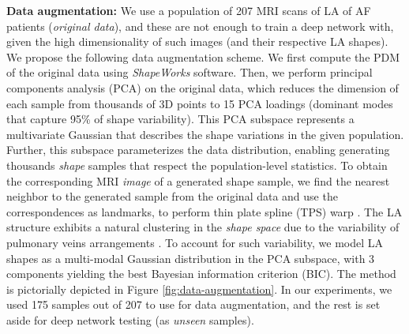 \documentclass[twocolumn]{cinc}
\begin{document}
\vspace{0.05in}
\noindent\textbf{Data augmentation: }
We use a population of 207 MRI scans of LA of AF patients (\textit{original data}), and these are not enough to train a deep network with, given the high dimensionality of such images (and their respective LA shapes).
%
We propose the following data augmentation scheme. We first compute the PDM of the original data using \emph{ShapeWorks} \cite{cates2017shapeworks} software. Then, we perform principal components analysis (PCA) on the original data, which reduces the dimension of each sample from thousands of 3D points to 15 PCA loadings (dominant modes that capture 95\% of shape variability). This PCA subspace represents a multivariate Gaussian that describes the shape variations in the given population. Further, this subspace parameterizes the data distribution, enabling generating thousands \textit{shape} samples that respect the population-level statistics. To obtain the corresponding MRI \textit{image} of a generated shape sample, we find the nearest neighbor to the generated sample from the original data and use the correspondences as landmarks, to perform thin plate spline (TPS) warp \cite{bookstein1989principal}. 
%
%
The LA structure exhibits a natural clustering in the \emph{shape space} due to the variability of pulmonary veins arrangements  \cite{sohns2011mdct}. To account for such variability, we model LA shapes as a multi-modal Gaussian distribution in the PCA subspace, with 3 components yielding the best Bayesian information criterion (BIC). The method is pictorially depicted in Figure \ref{fig:data-augmentation}.
In our experiments, we used 175 samples out of 207 to use for data augmentation, and the rest is set aside for deep network testing (as \textit{unseen} samples). 
\end{document}
